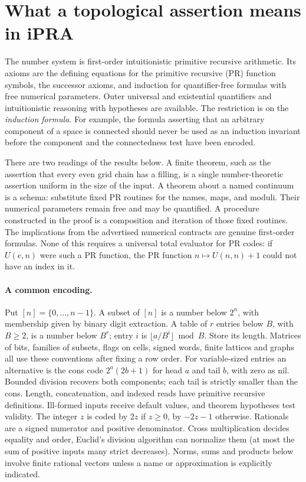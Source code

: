 \section{What a topological assertion means in iPRA}\label{sec:arithmetic}
The number system is first-order intuitionistic primitive recursive arithmetic. Its axioms are the defining equations for the primitive recursive (PR) function symbols, the successor axioms, and induction for quantifier-free formulas with free numerical parameters. Outer universal and existential quantifiers and intuitionistic reasoning with hypotheses are available. The restriction is on the \emph{induction formula}. For example, the formula asserting that an arbitrary component of a space is connected should never be used as an induction invariant before the component and the connectedness test have been encoded.

There are two readings of the results below. A finite theorem, such as the assertion that every even grid chain has a filling, is a single number-theoretic assertion uniform in the size of the input. A theorem about a named continuum is a schema: substitute fixed PR routines for the names, maps, and moduli. Their numerical parameters remain free and may be quantified. A procedure constructed in the proof is a composition and iteration of those fixed routines. The implications from the advertised numerical contracts are genuine first-order formulas. None of this requires a universal total evaluator for PR codes: if $U(e,n)$ were such a PR function, the PR function $n\mapsto U(n,n)+1$ could not have an index in it.

\paragraph{A common encoding.}
Put $[n]=\{0,\ldots,n-1\}$. A subset of $[n]$ is a number below $2^n$, with membership given by binary digit extraction. A table of $r$ entries below $B$, with $B\ge2$, is a number below $B^r$; entry $i$ is $\lfloor a/B^i\rfloor\bmod B$. Store its length. Matrices of bits, families of subsets, flags on cells, signed words, finite lattices and graphs all use these conventions after fixing a row order. For variable-sized entries an alternative is the cons code $2^a(2b+1)$ for head $a$ and tail $b$, with zero as nil. Bounded division recovers both components; each tail is strictly smaller than the cons. Length, concatenation, and indexed reads have primitive recursive definitions. Ill-formed inputs receive default values, and theorem hypotheses test validity. The integer $z$ is coded by $2z$ if $z\ge0$, by $-2z-1$ otherwise. Rationals are a signed numerator and positive denominator. Cross multiplication decides equality and order, Euclid's division algorithm can normalize them (at most the sum of positive inputs many strict decreases). Norms, sums and products below involve finite rational vectors unless a name or approximation is explicitly indicated.

